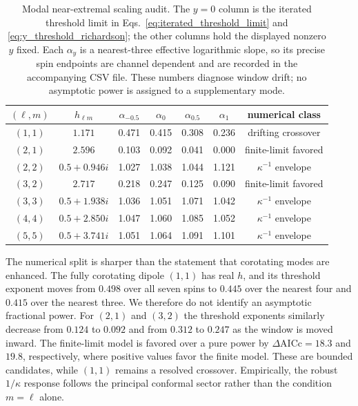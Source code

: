 \documentclass[aps,prd,twocolumn,10pt,nofootinbib,superscriptaddress,floatfix]{revtex4-2}
\begin{document}
\begin{table}[t]
\caption{Modal near-extremal scaling audit.  The $y=0$ column is the iterated threshold
limit in Eqs.~\eqref{eq:iterated_threshold_limit} and
\eqref{eq:y_threshold_richardson}; the other columns hold the displayed
nonzero $y$ fixed.  Each $\alpha_y$ is a nearest-three effective logarithmic
slope, so its precise spin endpoints are channel dependent and are recorded
in the accompanying CSV file.  These numbers diagnose window drift; no
asymptotic power is assigned to a supplementary mode.}
\label{tab:near-extremal-threshold}
\begin{ruledtabular}
\begin{tabular}{c c c c c c c}
$(\ell,m)$ & $h_{\ell m}$ & $\alpha_{-0.5}$ & $\alpha_{0}$
& $\alpha_{0.5}$ & $\alpha_{1}$ & numerical class\\
\hline
$(1,1)$ & $1.171$ & 0.471 & 0.415 & 0.308 & 0.236 & drifting crossover\\
$(2,1)$ & $2.596$ & 0.103 & 0.092 & 0.041 & 0.000 & finite-limit favored\\
$(2,2)$ & $0.5+0.946i$ & 1.027 & 1.038 & 1.044 & 1.121 & $\kappa^{-1}$ envelope\\
$(3,2)$ & $2.717$ & 0.218 & 0.247 & 0.125 & 0.090 & finite-limit favored\\
$(3,3)$ & $0.5+1.938i$ & 1.036 & 1.051 & 1.071 & 1.042 & $\kappa^{-1}$ envelope\\
$(4,4)$ & $0.5+2.850i$ & 1.047 & 1.060 & 1.085 & 1.052 & $\kappa^{-1}$ envelope\\
$(5,5)$ & $0.5+3.741i$ & 1.051 & 1.064 & 1.091 & 1.101 & $\kappa^{-1}$ envelope\\
\end{tabular}
\end{ruledtabular}
\end{table}

The numerical split is sharper than the statement that corotating modes are
enhanced.  The fully corotating dipole $(1,1)$ has real $h$, and its threshold
exponent moves from $0.498$ over all seven spins to $0.445$ over the nearest
four and $0.415$ over the nearest three.  We therefore do not identify an
asymptotic fractional power.  For $(2,1)$ and $(3,2)$ the threshold exponents
similarly decrease from $0.124$ to $0.092$ and from $0.312$ to $0.247$ as the
window is moved inward.  The finite-limit model is favored over a pure power
by $\Delta\mathrm{AICc}=18.3$ and $19.8$, respectively, where positive values
favor the finite model.  These are bounded candidates, while $(1,1)$ remains
a resolved crossover.  Empirically, the robust $1/\kappa$ response follows
the principal conformal sector rather than the condition $m=\ell$ alone.
\end{document}
